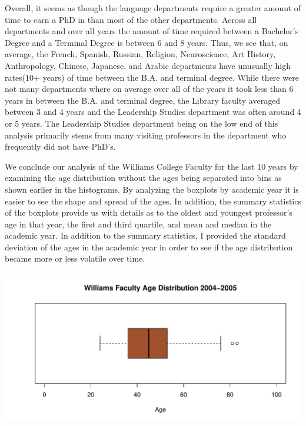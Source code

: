\documentclass[12pt,a4paper]{article}\usepackage[]{graphicx}\usepackage[]{color}
\makeatletter
\def\maxwidth{ %
  \ifdim\Gin@nat@width>\linewidth
    \linewidth
  \else
    \Gin@nat@width
  \fi
}
\newenvironment{knitrout}{}{} %
\theoremstyle{definition}
\makeatother
\begin{document}
\bigskip
Overall, it seems as though the language departments require a greater amount of time to earn a PhD in than most of the other departments. Across all departments and over all years the amount of time required between a Bachelor's Degree and a Terminal Degree is between 6 and 8 years. Thus, we see that, on average, the French, Spanish, Russian, Religion, Neuroscience, Art History, Anthropology, Chinese, Japanese, and Arabic departments have unusually high rates(10+ years) of time between the B.A. and terminal degree. While there were not many departments where on average over all of the years it took less than 6 years in between the B.A. and terminal degree, the Library faculty averaged between 3 and 4 years and the Leadership Studies department was often around 4 or 5 years. The Leadership Studies department being on the low end of this analysis primarily stems from many visiting professors in the department who frequently did not have PhD's.

\bigskip
We conclude our analysis of the Williams College Faculty for the last 10 years by examining the age distribution without the ages being separated into bins as shown earlier in the histograms. By analyzing the boxplots by academic year it is easier to see the shape and spread of the ages. In addition, the summary statistics of the boxplots provide us with details as to the oldest and youngest professor's age in that year, the first and third quartile, and mean and median in the academic year. In addition to the summary statistics, I provided the standard deviation of the ages in the academic year in order to see if the age distribution became more or less volatile over time.

\begin{knitrout}
\color{fgcolor}
\includegraphics[width=\maxwidth]{figure/unnamed-chunk-13-1} 

\end{knitrout}
\end{document}

